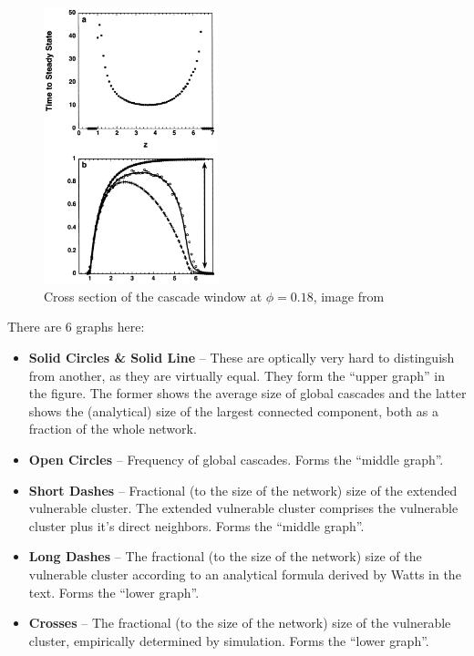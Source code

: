 \documentclass{sig-alternate-05-2015}
\begin{document}
\begin{figure}[h!]
  \centering
  \includegraphics[width=0.45\textwidth]{img/cross-section.png}
  \caption{Cross section of the cascade window at $\phi=0.18$, image from \cite{simplemodel}}
  \label{fig:cross-section}
\end{figure}

There are 6 graphs here:

\begin{itemize}
  \item \textbf{Solid Circles \& Solid Line} -- These are optically very hard to distinguish from another, as they are virtually equal. They form the ``upper graph'' in the figure. The former shows the average size of global cascades and the latter shows the (analytical) size of the largest connected component, both as a fraction of the whole network.
  \item \textbf{Open Circles} -- Frequency of global cascades. Forms the ``middle graph''.
  \item \textbf{Short Dashes} -- Fractional (to the size of the network) size of the extended vulnerable cluster. The extended vulnerable cluster comprises the vulnerable cluster plus it's direct neighbors. Forms the ``middle graph''.
  \item \textbf{Long Dashes} -- The fractional (to the size of the network) size of the vulnerable cluster according to an analytical formula derived by Watts in the text. Forms the ``lower graph''.
  \item \textbf{Crosses} -- The fractional (to the size of the network) size of the vulnerable cluster, empirically determined by simulation. Forms the ``lower graph''.
\end{itemize}
\end{document}
